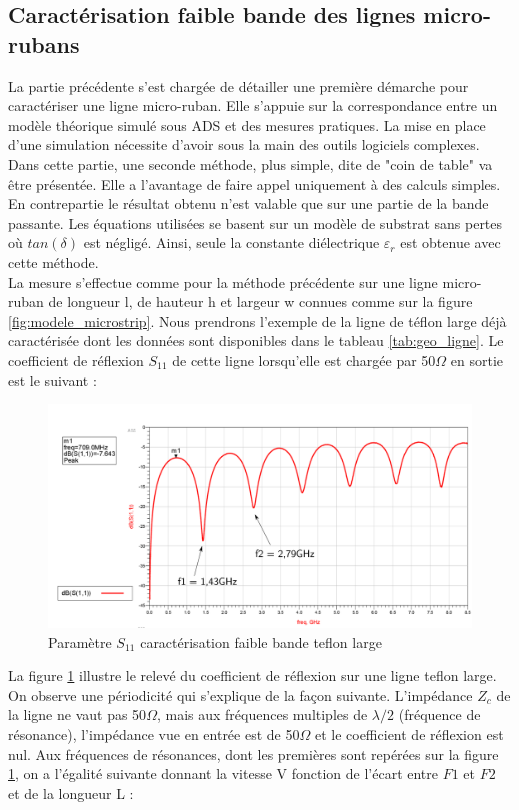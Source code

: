 \documentclass[french]{article}
\begin{document}
\subsection{Caractérisation faible bande des lignes micro-rubans}
La partie précédente s'est chargée de détailler une première démarche pour caractériser une ligne micro-ruban. Elle s'appuie sur la correspondance entre un modèle théorique simulé sous ADS et des mesures pratiques. La mise en place d'une simulation nécessite d'avoir sous la main des outils logiciels complexes. Dans cette partie, une seconde méthode, plus simple, dite de "coin de table" va être présentée. Elle a l'avantage de faire appel uniquement à des calculs simples. En contrepartie le résultat obtenu n'est valable que sur une partie de la bande passante. Les équations utilisées se basent sur un modèle de substrat sans pertes où $tan( \delta)$ est négligé. Ainsi, seule la constante diélectrique $\varepsilon_r$ est obtenue avec cette méthode. \\
La mesure s'effectue comme pour la méthode précédente sur une ligne micro-ruban de longueur l, de hauteur h et largeur w connues comme sur la figure \ref{fig:modele_microstrip}. Nous prendrons l'exemple de la ligne de téflon large déjà caractérisée dont les données sont disponibles dans le tableau \ref{tab:geo_ligne}. Le coefficient de réflexion $S_{11}$ de cette ligne lorsqu’elle est chargée par 50$\Omega$ en sortie est le suivant :
\begin{figure}[H]
	\centering
	\includegraphics[width=0.7\linewidth]{../2carac/S11_ADS/teflonLarge_commente}
	\caption{Paramètre $S_{11}$ caractérisation faible bande teflon large}
	\label{fig:teflonlargecommente}
\end{figure}
La figure \ref{fig:teflonlargecommente} illustre le relevé du coefficient de réflexion sur une ligne teflon large. On observe une périodicité qui s'explique de la façon suivante. L'impédance $Z_c$ de la ligne ne vaut pas 50$\Omega$, mais aux fréquences multiples de $\lambda /2$ (fréquence de résonance), l'impédance vue en entrée est de 50$\Omega$ et le coefficient de réflexion est nul. Aux fréquences de résonances, dont les premières sont repérées sur la figure \ref{fig:teflonlargecommente}, on a l'égalité suivante donnant la vitesse V fonction de l'écart entre $F1$ et $F2$ et de la longueur L :  
\end{document}
